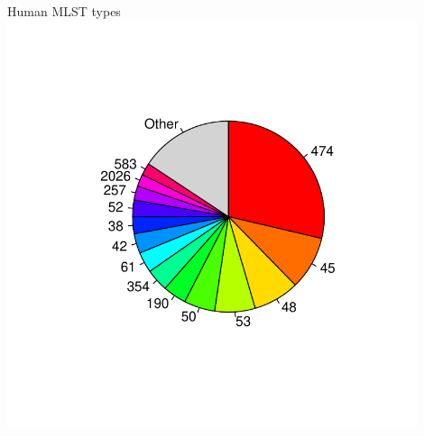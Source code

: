 \documentclass[]{beamer}
\begin{document}
\begin{frame}{Human MLST types}
\includegraphics[width=0.9\textwidth, trim=50 70 50 70]{Pictures/humans.pdf}
\end{frame}
\end{document}

